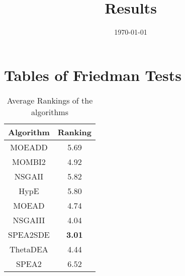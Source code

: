 \documentclass{article}
\title{Results}
\author{}
\date{\today}
\begin{document}
\oddsidemargin 0in \topmargin 0in\maketitle
\section{Tables of Friedman Tests}
\begin{table}[!htp]
\centering
\caption{Average Rankings of the algorithms
}\begin{tabular}{|c|c|}
\hline
Algorithm&Ranking\\
\hline
MOEADD&5.69\\\hline
MOMBI2&4.92\\\hline
NSGAII&5.82\\\hline
HypE&5.80\\\hline
MOEAD&4.74\\\hline
NSGAIII&4.04\\\hline
SPEA2SDE& {\bf 3.01}\\\hline
ThetaDEA&4.44\\\hline
SPEA2&6.52\\\hline
\end{tabular}
\end{table}
\end{document}
